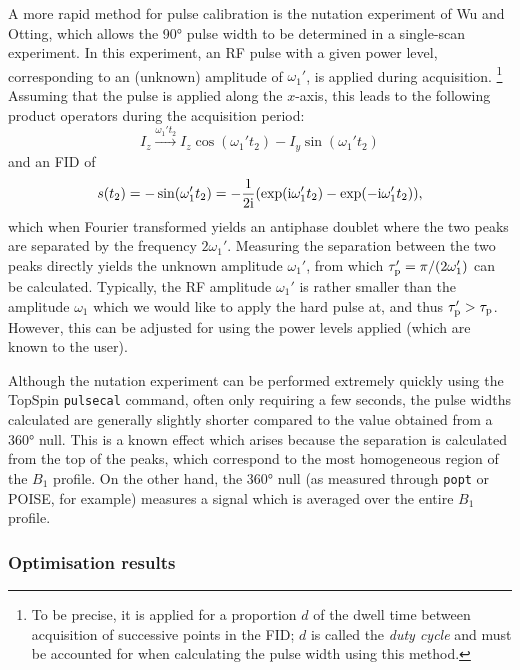 A more rapid method for pulse calibration is the nutation experiment of Wu and Otting\autocite{Wu2005JMR}, which allows the \ang{90} pulse width to be determined in a single-scan experiment.
In this experiment, an RF pulse with a given power level, corresponding to an (unknown) amplitude of $\omega_1'$, is applied during acquisition.%
\footnote{To be precise, it is applied for a proportion $d$ of the dwell time between acquisition of successive points in the FID; $d$ is called the \textit{duty cycle} and must be accounted for when calculating the pulse width using this method.}
Assuming that the pulse is applied along the $x$-axis, this leads to the following product operators during the acquisition period:
\begin{equation}
    \label{eq:pulsecal_operators}
    I_z \xrightarrow{\omega_1' t_2} I_z \cos(\omega_1' t_2) - I_y \sin(\omega_1' t_2)
\end{equation}
and an FID of
\begin{equation}
    \label{eq:pulsecal_signal}
    s(t_2) = -\sin(\omega_1't_2) = -\frac{1}{2\mathrm{i}}(\exp(\mathrm{i} \omega_1' t_2) - \exp(-\mathrm{i} \omega_1' t_2)),
\end{equation}
which when Fourier transformed yields an antiphase doublet where the two peaks are separated by the frequency $2\omega_1'$.
Measuring the separation between the two peaks directly yields the unknown amplitude $\omega_1'$, from which $\tau_\mathrm{p}' = \pi/(2\omega_1')$ can be calculated.
Typically, the RF amplitude $\omega_1'$ is rather smaller than the amplitude $\omega_1$ which we would like to apply the hard pulse at, and thus $\tau_\mathrm{p}' > \tau_\mathrm{p}$.
However, this can be adjusted for using the power levels applied (which are known to the user).

Although the nutation experiment can be performed extremely quickly using the TopSpin \texttt{pulsecal} command, often only requiring a few seconds, the pulse widths calculated are generally slightly shorter compared to the value obtained from a \ang{360} null.
This is a known effect which arises because the separation is calculated from the top of the peaks, which correspond to the most homogeneous region of the $B_1$ profile.\autocite{Wu2005JMR}
On the other hand, the \ang{360} null (as measured through \texttt{popt} or POISE, for example) measures a signal which is averaged over the entire $B_1$ profile.


\subsubsection{Optimisation results}

